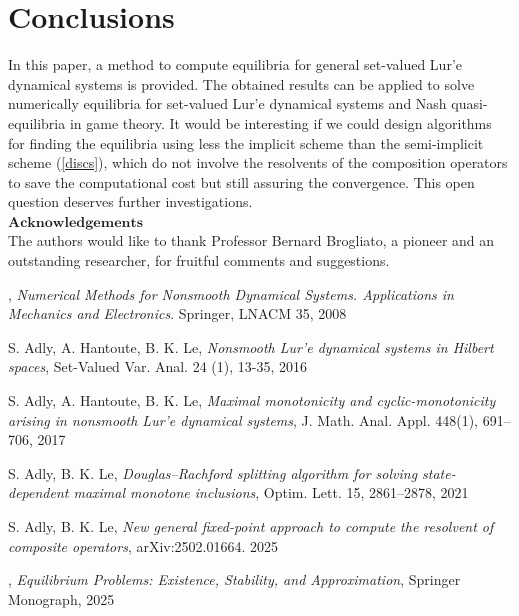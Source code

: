 \documentclass[11pt]{article}
\theoremstyle{plain}
\begin{document}
{\section{Conclusions}\label{sec7}
In this paper,  a method to compute   equilibria for  general set-valued Lur'e dynamical systems is provided. The obtained results can be applied to solve numerically equilibria for   set-valued Lur'e dynamical systems and   Nash {{quasi-equilibria}} in game theory.  It would be interesting if we could design algorithms for finding the  equilibria using less the implicit scheme than the semi-implicit scheme (\ref{discs}), which do not involve the resolvents of the composition operators to save the computational cost but still assuring the convergence.  This open question deserves further investigations. \\

\noindent $\mathbf{Acknowledgements}$\\

The authors would like to thank Professor Bernard Brogliato, a pioneer and an outstanding researcher,  for fruitful comments and suggestions. 
\begin{thebibliography}{}


 
, {\it  Numerical Methods for Nonsmooth Dynamical Systems. Applications
in Mechanics and Electronics}. Springer, LNACM 35, 2008


  { \sc S. Adly, A. Hantoute, B. K. Le}, {\it Nonsmooth Lur'e dynamical systems in Hilbert
spaces}, Set-Valued Var. Anal. 24 (1), 13-35, 2016

  { \sc S. Adly, A. Hantoute, B. K. Le}, {\it Maximal monotonicity and cyclic-monotonicity arising in nonsmooth Lur'e dynamical systems}, J. Math. Anal. Appl. 448(1), 691--706, 2017

  { \sc S. Adly, B. K. Le}, \textit{Douglas--Rachford splitting algorithm for solving state-dependent maximal monotone inclusions}, Optim. Lett. 15,  2861--2878, 2021

  { \sc S. Adly, B. K. Le}, {\it New general fixed-point approach to compute the resolvent of composite operators}, arXiv:2502.01664. 2025

, {\it Equilibrium Problems: Existence, Stability, and Approximation}, Springer Monograph, 2025


\end{thebibliography}}
\end{document}
